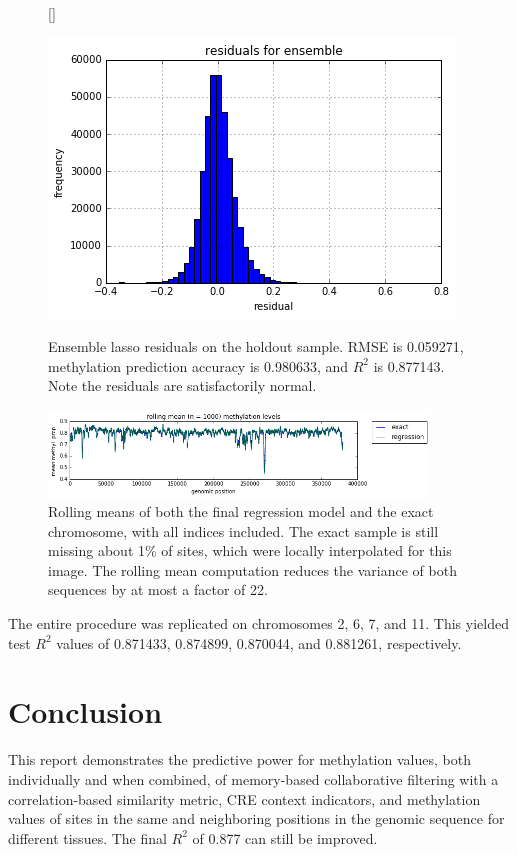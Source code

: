 \documentclass{article} %
\begin{document}
\begin{figure}[H]
    \centering
{}[\FBwidth]
{    \caption{Ensemble lasso residuals on the holdout sample. RMSE is 0.059271, methylation prediction accuracy is 0.980633, and $R^2$ is 0.877143. Note the residuals are satisfactorily normal.}
    \label{fig:finalres}}
    {\includegraphics[scale=0.4]{ensembleres.png}}
\end{figure}

\begin{figure}[H]
    \centering
    \includegraphics[width=0.9\textwidth]{ensembleseq.png}
    \caption{Rolling means of both the final regression model and the exact chromosome, with all indices included. The exact sample is still missing about 1\% of sites, which were locally interpolated for this image. The rolling mean computation reduces the variance of both sequences by at most a factor of 22.}
    \label{fig:finalgen}
\end{figure}

The entire procedure was replicated on chromosomes 2, 6, 7, and 11. This yielded test $R^2$ values of  0.871433, 0.874899, 0.870044, and 0.881261, respectively.

\section{Conclusion}

This report demonstrates the predictive power for methylation values, both individually and when combined, of memory-based collaborative filtering with a correlation-based similarity metric, CRE context indicators, and methylation values of sites in the same and neighboring positions in the genomic sequence for different tissues. The final $R^2$ of 0.877 can still be improved.
\end{document}
